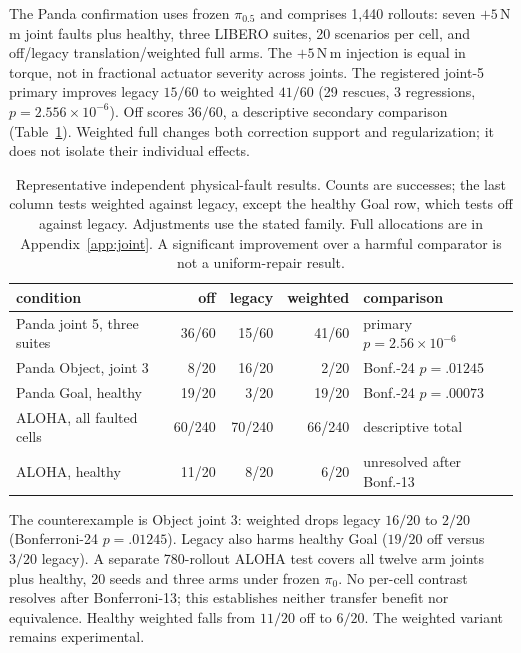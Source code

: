 \documentclass{article}
\begin{document}
The Panda confirmation uses frozen $\pi_{0.5}$ and comprises 1,440 rollouts: seven $+5$\,N\,m joint faults plus healthy,
three LIBERO suites, 20 scenarios per cell, and off/legacy translation/weighted full arms.
The $+5$\,N\,m injection is equal in torque, not in fractional actuator severity across joints.
The registered joint-5 primary improves legacy $15/60$ to weighted $41/60$ (29 rescues,
3 regressions, $p=2.556\times10^{-6}$). Off scores $36/60$, a descriptive secondary
comparison (Table~\ref{tab:main-physical}). Weighted full changes both correction support and regularization; it does not
isolate their individual effects.
\begin{table}[t]
\centering\small
\caption{Representative independent physical-fault results. Counts are successes; the last
column tests weighted against legacy, except the healthy Goal row, which tests off against
legacy. Adjustments use the stated family. Full allocations are in
Appendix~\ref{app:joint}. A significant improvement over a harmful comparator is not a
uniform-repair result.}
\label{tab:main-physical}
\begin{tabular}{lrrrl}
\toprule
condition & off & legacy & weighted & comparison \\
\midrule
Panda joint 5, three suites & 36/60 & 15/60 & 41/60 & primary $p=2.56\!\times\!10^{-6}$ \\
Panda Object, joint 3 & 8/20 & 16/20 & 2/20 & Bonf.-24 $p=.01245$ \\
Panda Goal, healthy & 19/20 & 3/20 & 19/20 & Bonf.-24 $p=.00073$ \\
ALOHA, all faulted cells & 60/240 & 70/240 & 66/240 & descriptive total \\
ALOHA, healthy & 11/20 & 8/20 & 6/20 & unresolved after Bonf.-13 \\
\bottomrule
\end{tabular}
\end{table}

The counterexample is Object joint 3: weighted drops legacy $16/20$ to $2/20$
(Bonferroni-24 $p=.01245$). Legacy also harms healthy Goal ($19/20$ off versus $3/20$
legacy). A separate 780-rollout ALOHA test covers all twelve arm joints plus healthy,
20 seeds and three arms under frozen $\pi_0$. No per-cell contrast resolves after Bonferroni-13; this establishes
neither transfer benefit nor equivalence. Healthy weighted falls from $11/20$ off to $6/20$.
The weighted variant remains experimental.
\end{document}
